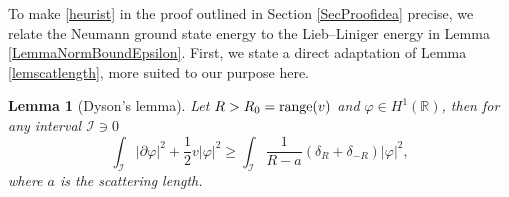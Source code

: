 \documentclass[a4paper,11pt]{article}
\newcommand{\abs}[1]{\left\lvert #1 \right\rvert}
\newcommand{\R}{\mathbb{R}}
\newtheorem{lemma}[theorem]{Lemma}
\numberwithin{equation}{section}
\begin{document}
	To make \eqref{heurist} in the proof outlined in Section \ref{SecProofidea} precise, we relate the Neumann ground state energy to the Lieb--Liniger energy in Lemma \ref{LemmaNormBoundEpsilon}. First, we state a direct adaptation of Lemma \ref{lemscatlength}, more suited to our purpose here. 
	
	\begin{lemma}[Dyson's lemma]\label{LemmaDyson} Let $ R>R_0=\textnormal{range}(v) $ and $ \varphi\in H^1(\R) $, then for any interval $ \mathcal{I}\ni 0 $ 
		\begin{equation}
			\int_{\mathcal{I}} \abs{\partial \varphi}^2+\frac12 v\abs{\varphi}^2\geq \int_{\mathcal{I}}\frac{1}{R-a}\left(\delta_R+\delta_{-R}\right)\abs{\varphi}^2,
		\end{equation}
		where $ a $ is the scattering length.
	\end{lemma}
	
	
	
\end{document}
